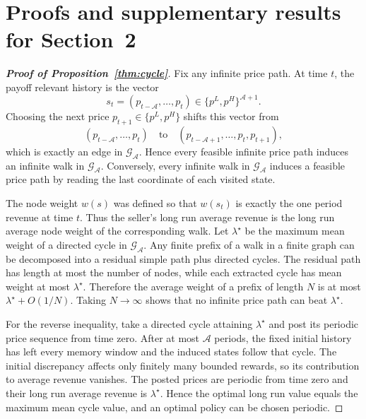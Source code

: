 \section{Proofs and supplementary results for Section~2}
\label{app:structural-proofs}

\begin{proof}[\normalfont\bfseries Proof of Proposition~\ref{thm:cycle}]
    Fix any infinite price path. At time \(t\), the payoff relevant history is the vector
    \[
        s_t=(p_{t-\mathcal A},\ldots,p_t)\in\{p^{L},p^{H}\}^{\mathcal A+1}.
    \]
    Choosing the next price \(p_{t+1}\in\{p^{L},p^{H}\}\) shifts this vector from
    \[
        (p_{t-\mathcal A},\ldots,p_t)
        \quad\text{to}\quad
        (p_{t-\mathcal A+1},\ldots,p_t,p_{t+1}),
    \]
    which is exactly an edge in \(\mathcal G_{\mathcal A}\). Hence every feasible infinite price path induces an infinite walk in \(\mathcal G_{\mathcal A}\). Conversely, every infinite walk in \(\mathcal G_{\mathcal A}\) induces a feasible price path by reading the last coordinate of each visited state.

The node weight \(w(s)\) was defined so that \(w(s_t)\) is exactly the one period revenue at time \(t\). Thus the seller's long run average revenue is the long run average node weight of the corresponding walk. Let \(\lambda^\star\) be the maximum mean weight of a directed cycle in \(\mathcal G_{\mathcal A}\). Any finite prefix of a walk in a finite graph can be decomposed into a residual simple path plus directed cycles. The residual path has length at most the number of nodes, while each extracted cycle has mean weight at most \(\lambda^\star\). Therefore the average weight of a prefix of length \(N\) is at most \(\lambda^\star+O(1/N)\). Taking \(N\to\infty\) shows that no infinite price path can beat \(\lambda^\star\).

    For the reverse inequality, take a directed cycle attaining \(\lambda^\star\) and post its periodic price sequence from time zero. After at most \(\mathcal A\) periods, the fixed initial history has left every memory window and the induced states follow that cycle. The initial discrepancy affects only finitely many bounded rewards, so its contribution to average revenue vanishes. The posted prices are periodic from time zero and their long run average revenue is \(\lambda^\star\). Hence the optimal long run value equals the maximum mean cycle value, and an optimal policy can be chosen periodic.
\end{proof}

